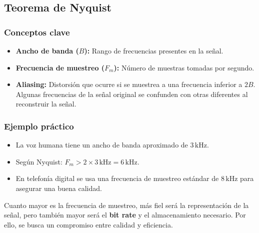 \documentclass[11pt,a4paper]{article}
\begin{document}
\subsection{Teorema de Nyquist}


\subsubsection*{Conceptos clave}
\begin{itemize}
  \item \textbf{Ancho de banda ($B$):} Rango de frecuencias presentes en la señal.
  \item \textbf{Frecuencia de muestreo ($F_m$):} Número de muestras tomadas por segundo.
  \item \textbf{Aliasing:} Distorsión que ocurre si se muestrea a una frecuencia inferior a $2B$.
  Algunas frecuencias de la señal original se confunden con otras diferentes al reconstruir la señal.
\end{itemize}

\subsubsection*{Ejemplo práctico}
\begin{itemize}
  \item La voz humana tiene un ancho de banda aproximado de $3\,\text{kHz}$.
  \item Según Nyquist: $F_m > 2 \times 3\,\text{kHz} = 6\,\text{kHz}$.
  \item En telefonía digital se usa una frecuencia de muestreo estándar de $8\,\text{kHz}$ para asegurar una buena calidad.
\end{itemize}

\begin{NotaBox}
Cuanto mayor es la frecuencia de muestreo, más fiel será la representación de la señal, pero también mayor será el \textbf{bit rate} y el almacenamiento necesario.
Por ello, se busca un compromiso entre calidad y eficiencia.
\end{NotaBox}
\end{document}
